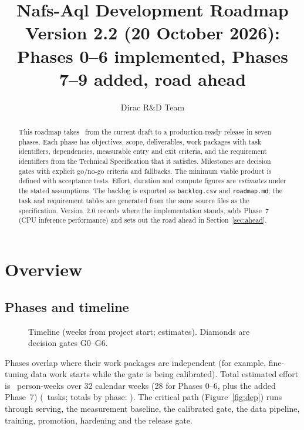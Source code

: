 \documentclass[11pt,a4paper]{article}
\title{\textbf{Nafs-Aql Development Roadmap}\\[4pt]\large Version 2.2 (20 October 2026): Phases 0--6 implemented, Phases 7--9 added, road ahead}
\author{Dirac R\&D Team}\date{}
\begin{document}
\maketitle
\begin{abstract}\noindent
This roadmap takes \Sys\ from the current draft to a production-ready release in seven phases. Each phase has objectives, scope, deliverables, work packages with task identifiers, dependencies, measurable entry and exit criteria, and the requirement identifiers from the Technical Specification that it satisfies. Milestones are decision gates with explicit go/no-go criteria and fallbacks. The minimum viable product is defined with acceptance tests. Effort, duration and compute figures are \emph{estimates} under the stated assumptions. The backlog is exported as \texttt{backlog.csv} and \texttt{roadmap.md}; the task and requirement tables are generated from the same source files as the specification. Version~2.0 records where the implementation stands, adds Phase~7 (CPU inference performance) and sets out the road ahead in Section~\ref{sec:ahead}.
\end{abstract}
\tableofcontents\clearpage

\section{Overview}
\subsection{Phases and timeline}
\begin{figure}[h]\centering\scalebox{1.6}{}\caption{Timeline (weeks from project start; estimates). Diamonds are decision gates G0--G6.}\label{fig:gantt}\end{figure}
Phases overlap where their work packages are independent (for example, fine-tuning data work starts while the gate is being calibrated). Total estimated effort is \PWGrand\ person-weeks over 32 calendar weeks (28 for Phases 0--6, plus the added Phase~7) (\NTasks\ tasks; totals by phase: \PWTotals). The critical path (Figure~\ref{fig:dep}) runs through serving, the measurement baseline, the calibrated gate, the data pipeline, training, promotion, hardening and the release gate.
\end{document}
